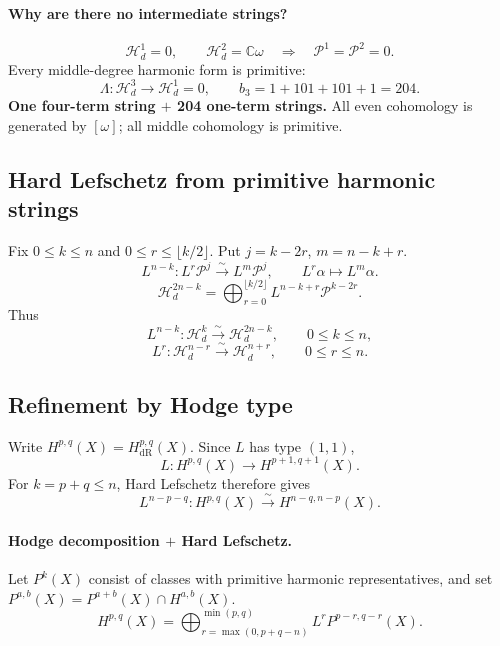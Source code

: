 \documentclass[11pt]{article}
\newcommand{\C}{\mathbb C}
\newcommand{\Hd}{\mathcal H_d}
\newcommand{\Prim}{\mathcal P}
\newcommand{\dR}{\mathrm{dR}}
\begin{document}
\paragraph{Why are there no intermediate strings?}
\[
 \Hd^1=0,\qquad\Hd^2=\C\omega
 \quad\Longrightarrow\quad\Prim^1=\Prim^2=0.
\]
Every middle-degree harmonic form is primitive:
\[
 \Lambda:\Hd^3\longrightarrow\Hd^1=0,\qquad
 b_3=1+101+101+1=204.
\]
\textbf{One four-term string $+$ 204 one-term strings.}
All even cohomology is generated by $[\omega]$; all middle cohomology
is primitive.

\subsection*{Hard Lefschetz from primitive harmonic strings}
Fix $0\leq k\leq n$ and $0\leq r\leq\lfloor k/2\rfloor$.
Put $j=k-2r$, $m=n-k+r$.
\[
 L^{n-k}:L^r\Prim^j\xrightarrow{\sim}L^m\Prim^j,
 \qquad L^r\alpha\longmapsto L^m\alpha.
\]
\[
 \Hd^{2n-k}
 =\bigoplus_{r=0}^{\lfloor k/2\rfloor}L^{n-k+r}\Prim^{k-2r}.
\]
Thus
\[
 L^{n-k}:\Hd^k\xrightarrow{\sim}\Hd^{2n-k},\qquad0\leq k\leq n,
\]
\[
 L^r:\Hd^{n-r}\xrightarrow{\sim}\Hd^{n+r},\qquad0\leq r\leq n.
\]

\subsection*{Refinement by Hodge type}
Write $H^{p,q}(X)=H^{p,q}_{\dR}(X)$. Since $L$ has type $(1,1)$,
\[
 L:H^{p,q}(X)\longrightarrow H^{p+1,q+1}(X).
\]
For $k=p+q\leq n$, Hard Lefschetz therefore gives
\[
 L^{n-p-q}:H^{p,q}(X)\xrightarrow{\sim}H^{n-q,n-p}(X).
\]
\paragraph{Hodge decomposition $+$ Hard Lefschetz.}
Let $P^k(X)$ consist of classes with primitive harmonic
representatives, and set $P^{a,b}(X)=P^{a+b}(X)\cap H^{a,b}(X)$.
\[
 H^{p,q}(X)=\bigoplus_{r=\max(0,p+q-n)}^{\min(p,q)}
 L^rP^{p-r,q-r}(X).
\]

\end{document}
